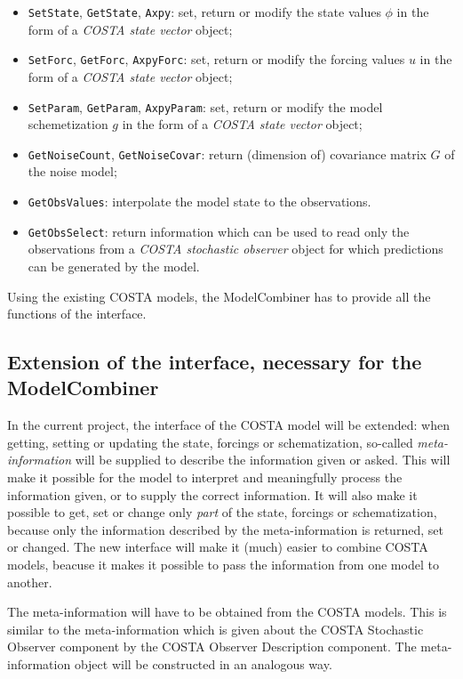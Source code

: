 \documentclass[a4paper,12pt]{article}
\begin{document}
\begin{itemize}
 \item {\tt SetState}, {\tt GetState}, {\tt Axpy}: 
                      set, return or modify the state values $\phi$
                      in the form of a {\em COSTA state vector} object;
 \item {\tt SetForc}, {\tt GetForc}, {\tt AxpyForc}: 
                      set, return or modify the forcing values $u$
                      in the form of a {\em COSTA state vector} object;
 \item {\tt SetParam}, {\tt GetParam}, {\tt AxpyParam}: 
                      set, return or modify the model schemetization $g$
                      in the form of a {\em COSTA state vector} object; 
\item {\tt GetNoiseCount}, {\tt GetNoiseCovar}: 
                      return (dimension of) covariance matrix $G$ of the 
                      noise model;
 \item {\tt GetObsValues}: interpolate the model state to the observations.
 \item {\tt GetObsSelect}: return information which can be used to
                      read only the observations from a 
                      {\em COSTA stochastic observer} object for which
                      predictions can be generated by the model.
\end{itemize}

Using the existing COSTA models, the ModelCombiner has to provide all the 
functions of the interface.


\subsection{Extension of the interface, necessary for the ModelCombiner}
In the current project, the interface of the COSTA model will be extended:
when getting, setting or updating the state, forcings or schematization,
so-called {\em meta-information} will be supplied to describe the
information given or asked. This will make it possible for the model to
interpret and meaningfully process the information given, or to supply the
correct information. It will also make it possible to get, set or change
only {\em part} of the state, forcings or schematization, because only the
information described by the meta-information is returned, set or changed.
The new interface will make it (much) easier to combine COSTA models,
beacuse it makes it possible to pass the information from one model to
another. 

The meta-information will have to be obtained from the COSTA models. 
This is similar to the meta-information which is given about the COSTA
Stochastic Observer component by the COSTA Observer Description component.  
The meta-information object will be constructed in an analogous way.
\end{document}
